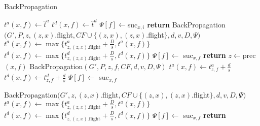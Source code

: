 \documentclass[../main.tex]{subfiles}
\begin{document}
\begin{algorithm}
\caption{BackPropagation}\label{alg:backPropagation}
\begin{algorithmic}
    \State $t^a(x,f)\gets \hat t^a$
    \State $t^d(x,f)\gets \hat t^d$
    \State $\Psi[f]\gets $suc$_{x,i}$
    \State \textbf{return} 
        \State BackPropagation$(G',P,z,(z,x).$flight$, CF\cup\{(z,x),(z,x).$flight$\},d,v,D,\Psi)$
        \State $t^a(x,f)\gets \max\{t^a_{z,(z,x).\text{flight}} + \frac D s, t^a(x,f)\}$
        \State $t^d(x,f)\gets \max\{t^d_{z,(z,x).\text{flight}} + \frac D s, t^d(x,f)\}$
        \State $\Psi[f]\gets$ suc$_{x,f}$
    \EndFor
    \State \textbf{return} 
\EndIf
{}
    \State $z\gets $prec$(x,f)$
    \State BackPropagation$(G',P,z,f,CF,d,v,D,\Psi)$    
    \State $t^a(x,f)\gets t^a_{z,f} + \frac d s$
    \State $t^d(x,f)\gets t^d_{z,f} + \frac d s$
    \State $\Psi[f]\gets$ suc$_{x,f}$

\Else
            \State BackPropagation$(G',z,(z,x).$flight$, CF\cup\{(z,x),(z,x).$flight$\},d,v,D,\Psi)$
            \State $t^a(x,f)\gets \max\{t^a_{z,(z,x).\text{flight}} + \frac D s, t^a(x,f)\}$
            \State $t^d(x,f)\gets \max\{t^d_{z,(z,x).\text{flight}} + \frac D s, t^d(x,f)\}$
         \EndIf
        \State $\Psi[f]\gets$ suc$_{x,f}$
    \EndFor
\EndIf
\State \textbf{return}
\end{algorithmic}
\end{algorithm}
\end{document}
